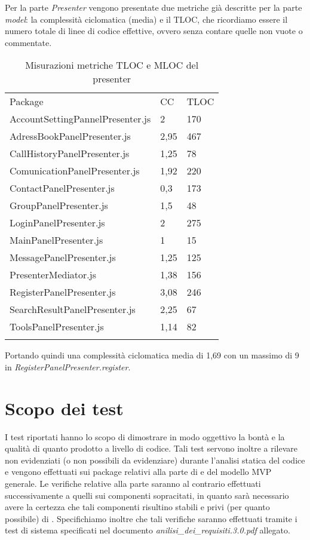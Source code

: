 Per la parte \textit{Presenter} vengono presentate due metriche già descritte per la parte \textit{model}: la complessità ciclomatica (media) e il TLOC, che ricordiamo essere il numero totale di linee di codice effettive, ovvero senza contare quelle non vuote o commentate.

\begin{center}
\begin{longtable}{p{}ll}
\toprule Package & CC  & TLOC\\
AccountSettingPannelPresenter.js & 2 & 170\\
AdressBookPanelPresenter.js & 2,95 & 467\\
CallHistoryPanelPresenter.js & 1,25 & 78\\
ComunicationPanelPresenter.js & 1,92 & 220\\
ContactPanelPresenter.js & 0,3 & 173\\
GroupPanelPresenter.js & 1,5 & 48\\
LoginPanelPresenter.js & 2 & 275\\
MainPanelPresenter.js & 1 & 15\\
MessagePanelPresenter.js & 1,25 & 125\\
PresenterMediator.js & 1,38 & 156\\
RegisterPanelPresenter.js & 3,08 & 246\\
SearchResultPanelPresenter.js & 2,25 & 67\\
ToolsPanelPresenter.js & 1,14 & 82\\
\midrule

\bottomrule
\caption{Misurazioni metriche TLOC e MLOC del presenter} \label{tab: metricheTLOCMLOCpresenter}

\end{longtable}
\end{center}
Portando quindi una complessità ciclomatica media di 1,69 con un massimo di 9 in \textit{RegisterPanelPresenter.register}.


\section{Scopo dei test}
I test riportati hanno lo scopo di dimostrare in modo oggettivo la bontà e la qualità di quanto prodotto a livello di codice. Tali test servono inoltre a rilevare  non evidenziati (o non possibili da evidenziare) durante l'analisi statica del codice e vengono effettuati sui package relativi alla parte di  e  del modello MVP generale.
Le verifiche relative alla parte  saranno al contrario effettuati successivamente a quelli sui componenti sopracitati, in quanto sarà necessario avere la certezza che tali componenti risultino stabili e privi (per quanto possibile) di . 
Specifichiamo inoltre che tali verifiche saranno effettuati tramite i test di sistema specificati nel documento \textit{anilisi\_dei\_requisiti.3.0.pdf} allegato.

